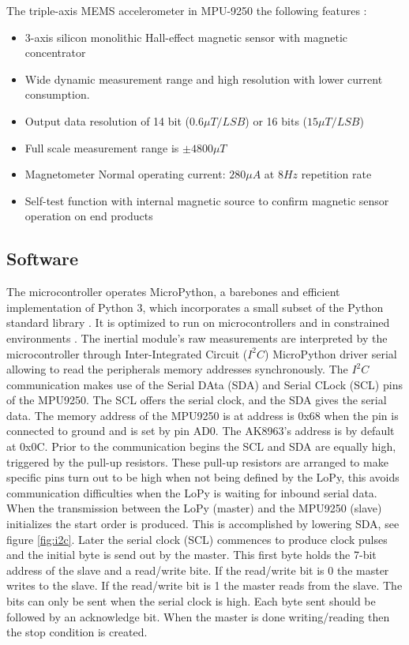 The triple-axis MEMS accelerometer in MPU-9250 the following features \cite{mpu9250specification}:
\begin{itemize}
    \item 3-axis silicon monolithic Hall-effect magnetic sensor with magnetic concentrator
    \item Wide dynamic measurement range and high resolution with lower current consumption.
    \item Output data resolution of 14 bit ($0.6 \mu T/LSB$) or 16 bits ($15 \mu T/LSB$)
    \item Full scale measurement range is $\pm 4800 \mu T$
    \item Magnetometer Normal operating current: $280\mu A$ at $8 Hz$ repetition rate
    \item Self-test function with internal magnetic source to confirm magnetic sensor operation on end products
\end{itemize}



\subsection{Software}

The microcontroller operates MicroPython, a barebones and efficient implementation of Python 3, which incorporates a small subset of the Python standard library \cite{micropython}. It is optimized to run on microcontrollers and in constrained environments \cite{tollervey2017programming}. The inertial module's raw measurements are interpreted by the microcontroller through Inter-Integrated Circuit ($I^2C$) MicroPython driver serial allowing to read the peripherals memory addresses synchronously. The $I^2C$ communication makes use of the Serial DAta (SDA) and Serial CLock (SCL) pins of the MPU9250. The SCL offers the serial clock, and the SDA gives the serial data. The memory address of the MPU9250 is at address is 0x68 when the pin is connected to ground and is set by pin AD0. The AK8963's address is by default at 0x0C. Prior to the communication begins the SCL and SDA are equally high, triggered by the pull-up resistors. These pull-up resistors are arranged to make specific pins turn out to be high when not being defined by the LoPy, this avoids communication difficulties when the LoPy is waiting for inbound serial data.
When the transmission between the LoPy (master) and the MPU9250 (slave) initializes the start order is produced. This is accomplished by lowering SDA, see figure \ref{fig:i2c}. Later the serial clock (SCL) commences to produce clock pulses and the initial byte is send out by the master. This first byte holds the 7-bit address of the slave and a read/write bite. If the read/write bit is 0 the master writes to the slave. If the read/write bit is 1 the master reads from the slave. The bits can only be sent when the serial clock is high. Each byte sent should be followed by an acknowledge bit. When the master is done writing/reading then the stop condition is created.

